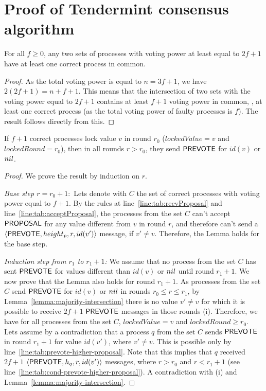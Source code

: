 \section{Proof of Tendermint consensus algorithm} \label{sec:proof}

\begin{lemma} \label{lemma:majority-intersection} For all $f\geq 0$, any two
sets of processes with voting power at least equal to $2f+1$ have at least one
correct process in common.  \end{lemma}

\begin{proof} As the total voting power is equal to $n=3f+1$, we have $2(2f+1)
    = n+f+1$.  This means that the intersection of two sets with the voting
    power equal to $2f+1$ contains at least $f+1$ voting power in common, \ie,
    at least one correct process (as the total voting power of faulty processes
    is $f$). The result follows directly from this.  \end{proof}

\begin{lemma} \label{lemma:locked-decision_value-prevote-v} If $f+1$ correct
processes lock value $v$ in round $r_0$ ($lockedValue = v$ and $lockedRound =
r_0$), then in all rounds $r > r_0$, they send $\mathsf{PREVOTE}$ for $id(v)$ or
$nil$.  \end{lemma}

\begin{proof} We prove the result by induction on $r$.

\emph{Base step $r = r_0 + 1:$} Lets denote with $C$ the set of correct
processes with voting power equal to $f+1$.  By the rules at
line~\ref{line:tab:recvProposal} and line~\ref{line:tab:acceptProposal}, the
processes from the set $C$ can't accept $\mathsf{PROPOSAL}$ for any value different
from $v$ in round $r$, and therefore can't send a $\langle\mathsf{PREVOTE},height_p,
r,id(v')\rangle$ message, if $v' \neq v$. Therefore, the Lemma holds for the base
step.

\emph{Induction step from $r_1$ to $r_1+1$:} We assume that no process from the
set $C$ has sent $\mathsf{PREVOTE}$ for values different than $id(v)$ or $nil$ until
round $r_1 + 1$. We now prove that the Lemma also holds for round $r_1 + 1$. As
processes from the set $C$ send $\mathsf{PREVOTE}$ for $id(v)$ or $nil$ in rounds $r_0
\le r \le r_1$, by Lemma~\ref{lemma:majority-intersection} there is no value
$v' \neq v$ for which it is possible to receive $2f+1$ $\mathsf{PREVOTE}$ messages in
those rounds (i). Therefore, we have for all processes from the set $C$,
$lockedValue = v$ and $lockedRound \ge r_0$.   Lets assume by a contradiction
that a process $q$ from the set $C$ sends $\mathsf{PREVOTE}$ in round $r_1 + 1$ for
value $id(v')$, where $v' \neq v$. This is possible only by
line~\ref{line:tab:prevote-higher-proposal}.  Note that this implies that $q$
received $2f+1$ $\langle\mathsf{PREVOTE},h_q, r,id(v')\rangle$ messages, where $r > r_0$ and $r
< r_1 +1$ (see line~\ref{line:tab:cond-prevote-higher-proposal}). A
contradiction with (i) and Lemma~\ref{lemma:majority-intersection}.
\end{proof}	

